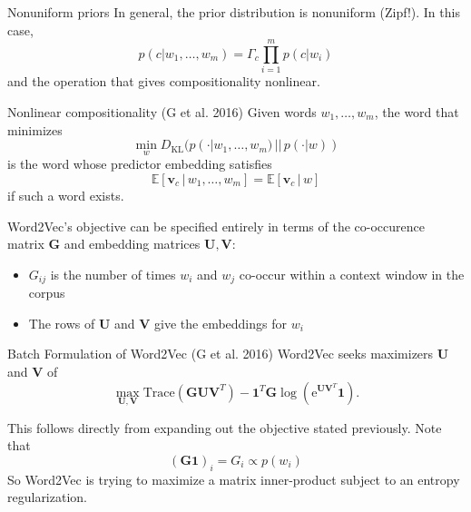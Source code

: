 \documentclass[xcolor=x11names,compress,ignorenonframetext,10pt]{beamer}
\renewcommand{\(}{\begin{columns}}
\renewcommand{\)}{\end{columns}}
\newcommand{\<}[1]{\begin{column}{#1}}
\renewcommand{\>}{\end{column}}
\def\refcolor{DodgerBlue4}
\newcommand{\refer}[1]{({\color{\refcolor}#1})}
\begin{document}
\begin{frame}{Nonuniform priors}
  In general, the prior distribution is nonuniform (Zipf!). In this case,
  \[
    p( c | w_1, \ldots, w_m) = \Gamma_c \prod_{i=1}^m p(c | w_i)
  \]
  and the operation that gives compositionality nonlinear.

  \begin{block}{Nonlinear compositionality \refer{G et al. 2016}}
  Given words $w_1, \ldots, w_m$, the word that minimizes 
    \[
      \min_{w} D_{\textrm{KL}}(p (\cdot | w_1, \ldots, w_m)\, ||\, p(\cdot | w))
    \]
    is the word whose predictor embedding satisfies
    \[
      \mathbb{E}[\mathbf{v}_c \,|\, w_1, \ldots, w_m] = \mathbb{E}[\mathbf{v}_c \,|\, w]
    \]
    if such a word exists.
  \end{block}
\end{frame}
\begin{frame}
  Word2Vec's objective can be specified entirely in terms of the co-occurence matrix $\mathbf{G}$ and embedding matrices $\mathbf{U}, \mathbf{V}$:
  \begin{itemize}
    \item $G_{ij}$ is the number of times $w_i$ and $w_j$ co-occur within a context window in the corpus
    \item The rows of $\mathbf{U}$ and $\mathbf{V}$ give the embeddings for $w_i$
  \end{itemize}

  \begin{block}{Batch Formulation of Word2Vec \refer{G et al. 2016}}
    Word2Vec seeks maximizers $\mathbf{U}$ and $\mathbf{V}$ of 
    \[
    \max_{\mathbf{U}, \mathbf{V}} \textrm{Trace}(\mathbf{G} \mathbf{U} \mathbf{V}^T) - \mathbf{1}^T \mathbf{G} \log( \mathrm{e}^{\mathbf{U} \mathbf{V}^T} \mathbf{1}).
  \]
  \end{block}

  This follows directly from expanding out the objective stated previously. Note that
  \[ (\mathbf{G}\mathbf{1})_i = G_i \propto p(w_i) \]
  So Word2Vec is trying to maximize a matrix inner-product subject to an entropy regularization.
\end{frame}
\end{document}
